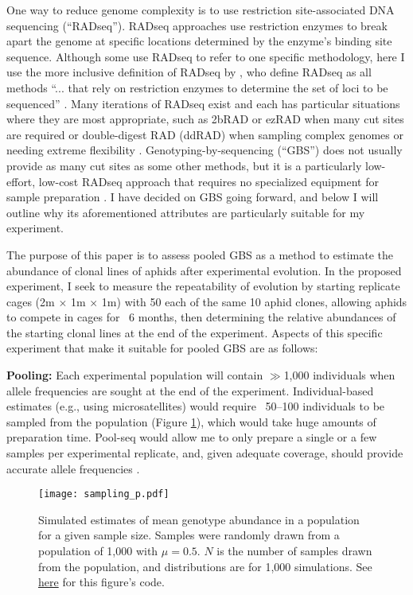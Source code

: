 One way to reduce genome complexity is to use restriction site-associated DNA 
sequencing (``RADseq'').
RADseq approaches use restriction enzymes to break apart the genome at specific 
locations determined by the enzyme's binding site sequence.
Although some use RADseq to refer to one specific methodology, here I use the more
inclusive definition of RADseq by
\citet{Andrews:2016bc}, who define RADseq as all methods 
``... that rely on restriction enzymes to determine the set of loci to be sequenced''
\citep[p 81]{Andrews:2016bc}.
Many iterations of RADseq exist and each has particular situations where they are most 
appropriate, such as 2bRAD or ezRAD when many cut sites are required or double-digest RAD
(ddRAD) when sampling complex genomes or needing extreme flexibility 
\citep{Andrews:2016bc}.
Genotyping-by-sequencing (``GBS'') does not usually provide as many cut sites as some 
other methods, but it is a particularly low-effort, low-cost RADseq approach
that requires no specialized equipment for sample preparation \citep{Elshire:2011gn}.
I have decided on GBS going forward, and below I will outline why its aforementioned
attributes are particularly suitable for my experiment.

The purpose of this paper is to assess pooled GBS as a method to estimate the abundance 
of clonal lines of aphids after experimental evolution.
In the proposed experiment, I seek to measure the repeatability of evolution by 
starting replicate cages (2m $\times$ 1m $\times$ 1m) with 50 each of the same 10 aphid
clones, allowing aphids to compete in cages for ~6 months, then determining the relative
abundances of the starting clonal lines at the end of the experiment.
Aspects of this specific experiment that make it suitable for pooled GBS are as follows:

\textbf{Pooling:}
Each experimental population will contain $\gg$1,000 individuals when allele frequencies 
are sought at the end of the experiment. Individual-based estimates (e.g., using 
microsatellites) would require ~50--100  individuals to be sampled from the population 
(Figure \ref{fig:sampling}), which would take huge amounts of preparation time. Pool-seq 
would allow me to only prepare a single or a few samples per  experimental 
replicate, and, given adequate coverage, should provide accurate allele frequencies 
\citep{Schlotterer:2014dk}.


\begin{figure}[!ht]
    \centering
    \texttt{[image: sampling\_p.pdf]}
    \caption{Simulated estimates of mean genotype abundance in a population for a given
        sample size. Samples were randomly drawn from a population of 1,000 with 
        $\mu = 0.5$. $N$ is the number of samples drawn from the population, and 
        distributions are for 1,000 simulations.
        See \href{https://github.com/lucasnell/mol_ecol/blob/master/samp_plot.R}{here} 
        for this figure's code.}
    \label{fig:sampling}
\end{figure}



